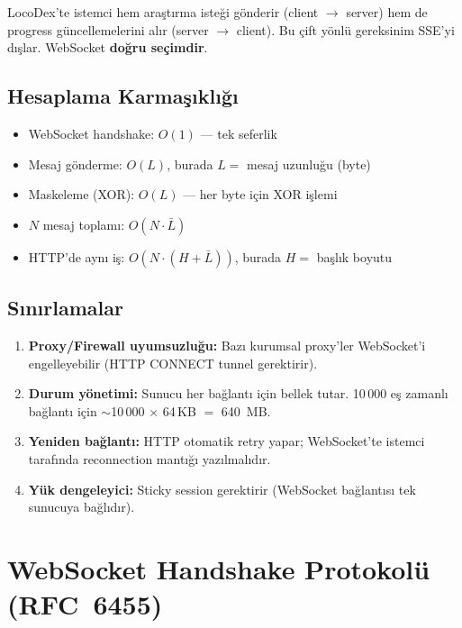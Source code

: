 LocoDex'te istemci hem ara\c{s}t{\i}rma iste\u{g}i g\"{o}nderir (client $\to$ server) hem de progress g\"{u}ncellemelerini al{\i}r (server $\to$ client). Bu \c{c}ift y\"{o}nl\"{u} gereksinim SSE'yi d{\i}\c{s}lar. WebSocket \textbf{do\u{g}ru se\c{c}imdir}.

\subsection{Hesaplama Karma\c{s}{\i}kl{\i}\u{g}{\i}}
\label{sec:ws-complexity}

\begin{itemize}
  \item WebSocket handshake: $O(1)$ --- tek seferlik
  \item Mesaj g\"{o}nderme: $O(L)$, burada $L =$ mesaj uzunlu\u{g}u (byte)
  \item Maskeleme (XOR): $O(L)$ --- her byte i\c{c}in XOR i\c{s}lemi
  \item $N$ mesaj toplam{\i}: $O(N \cdot \bar{L})$
  \item HTTP'de ayn{\i} i\c{s}: $O(N \cdot (H + \bar{L}))$, burada $H =$ ba\c{s}l{\i}k boyutu
\end{itemize}

\subsection{S{\i}n{\i}rlamalar}
\label{sec:ws-limitations}

\begin{enumerate}
  \item \textbf{Proxy/Firewall uyumsuzlu\u{g}u:} Baz{\i} kurumsal proxy'ler WebSocket'i engelleyebilir (HTTP CONNECT tunnel gerektirir).
  \item \textbf{Durum y\"{o}netimi:} Sunucu her ba\u{g}lant{\i} i\c{c}in bellek tutar. 10\,000 e\c{s} zamanl{\i} ba\u{g}lant{\i} i\c{c}in $\sim$10\,000 $\times$ 64\,KB $=$ 640~MB.
  \item \textbf{Yeniden ba\u{g}lant{\i}:} HTTP otomatik retry yapar; WebSocket'te istemci taraf{\i}nda reconnection mant{\i}\u{g}{\i} yaz{\i}lmal{\i}d{\i}r.
  \item \textbf{Y\"{u}k dengeleyici:} Sticky session gerektirir (WebSocket ba\u{g}lant{\i}s{\i} tek sunucuya ba\u{g}l{\i}d{\i}r).
\end{enumerate}


\section{WebSocket Handshake Protokol\"{u} (RFC~6455)}
\label{sec:ws-handshake}

